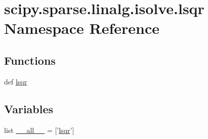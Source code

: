\hypertarget{namespacescipy_1_1sparse_1_1linalg_1_1isolve_1_1lsqr}{}\section{scipy.\+sparse.\+linalg.\+isolve.\+lsqr Namespace Reference}
\label{namespacescipy_1_1sparse_1_1linalg_1_1isolve_1_1lsqr}
\subsection*{Functions}
\begin{DoxyCompactItemize}
\item 
def \hyperlink{namespacescipy_1_1sparse_1_1linalg_1_1isolve_1_1lsqr_a2f2cd7619483647e71eead2a14022afe}{lsqr}
\end{DoxyCompactItemize}
\subsection*{Variables}
\begin{DoxyCompactItemize}
\item 
list \hyperlink{namespacescipy_1_1sparse_1_1linalg_1_1isolve_1_1lsqr_ad612600fe23bc04f2f65f127e3b93d1c}{\+\_\+\+\_\+all\+\_\+\+\_\+} = \mbox{[}'\hyperlink{namespacescipy_1_1sparse_1_1linalg_1_1isolve_1_1lsqr_a2f2cd7619483647e71eead2a14022afe}{lsqr}'\mbox{]}
\end{DoxyCompactItemize}


